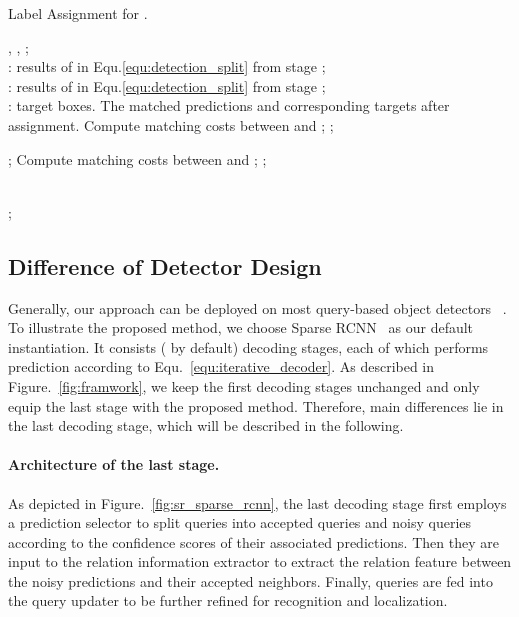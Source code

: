 \documentclass[final]{cvpr}
\begin{document}
\begin{algorithm}[t] 
\caption{Label Assignment for .} 
\label{alg:yn} 
\begin{algorithmic}[1] 
\Require 
, , ; \\
 : results of  in Equ.\eqref{equ:detection_split} from stage ; \\
 :  results of  in Equ.\eqref{equ:detection_split} from stage ;\\
: target boxes.
\Ensure 
The matched predictions  and corresponding targets  after assignment.
\State Compute matching costs  between  and ;
\State ;

\State ;
\State Compute matching costs  between  and ;
\State ;

\\ 
\Return ; 
\end{algorithmic}\label{algorithm:first}
\end{algorithm}

\vspace{-1pt}
\subsection{Difference of Detector Design}

Generally, our approach can be deployed on most query-based object detectors ~\cite{carion2020end, sun2020sparse, zhu2021deformable}. To illustrate the proposed method, we choose Sparse RCNN~\cite{sun2020sparse} as our default instantiation. It consists  ( by default) decoding stages, each of which performs prediction according to Equ.~\eqref{equ:iterative_decoder}. As described in Figure.~\ref{fig:framwork}, we keep the first  decoding stages unchanged and only equip the last stage with the proposed method. Therefore, main differences lie in the last decoding stage, which will be described in the following.

\vspace{-0.6cm}
\paragraph{Architecture of the last stage.} 

As depicted in Figure.~\ref{fig:sr_sparse_rcnn}, the last decoding stage  first employs a prediction selector  to split queries into accepted queries and noisy queries according to the confidence scores of their associated predictions. Then they are input to the relation information extractor  to extract the relation feature between the noisy predictions and their accepted neighbors. Finally, queries are fed into the query updater  to be further refined for recognition and localization.
\end{document}
